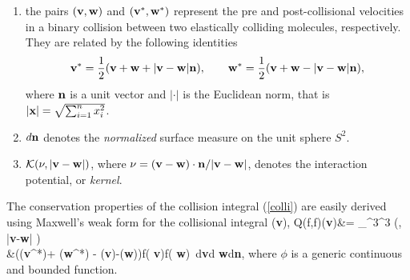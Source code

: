 \documentclass{article}
\newcommand{\bv}{\mathrm{BV}}
\newcommand{\fer}[1]{(\ref{#1})}
\newenvironment{equations}{\equation\aligned}{\endaligned\endequation}
\newcommand{\R}{\mathbb R}
\def\R{\mathbb{R}}
\def\bx{{\bf x}}
\def\bv{{\bf v}}
\def\bw{{\bf w}}
\begin{document}
\begin{enumerate}[label=(\roman*)]
    \item the pairs $(\bv,\bw)$ and $(\bv^*,\bw^*)$ represent the pre and post-collisional velocities in a binary collision between two elastically colliding molecules, respectively. They are related by the following identities
    \begin{equation}
        \label{col}
        \bv^* = {1\over 2}(\bv+\bw+|\bv-\bw|{\bf n}) ,\qquad \bw^* = {1\over 2}(\bv+\bw-|\bv-\bw|{\bf n}),
    \end{equation}
    where ${\bf n}$ is a unit vector and $|\cdot|$ is the Euclidean norm, that is $|\bx|=\sqrt{\sum_{i=1}^nx_i^2}$.
    \item $d{\bf n}$ denotes the {\it normalized} surface measure on the unit sphere $S^2$.
    \item $\mathcal{K}(\nu, |\bv-\bw|)$, where $\nu = (\bv - \bw)\cdot{\bf n}/|\bv - \bw|$, denotes the interaction potential, or \textit{kernel}.
\end{enumerate} 


The conservation properties of the collision integral \fer{colli} are easily derived using Maxwell's weak form for the collisional integral\cite{Bob1}
\begin{equations}\label{weak}
  \langle \phi(\bv), Q\bigl(f,f\bigr)(\bv)\rangle &=   \int_{{\R}^3\times\R^3} \left(\nu, {|\bv-\bw|} \right) \cdot \\
 &\quad\quad\quad \cdot \left(\phi(\bv^*)+ \phi(\bw^*) - \phi(\bv)-\phi(\bw)\right)f( \bv)f( \bw)\, d\bv d \bw d{\bf n},
\end{equations}
% 
where $\phi$ is a generic continuous and bounded function.
% 
\end{document}
